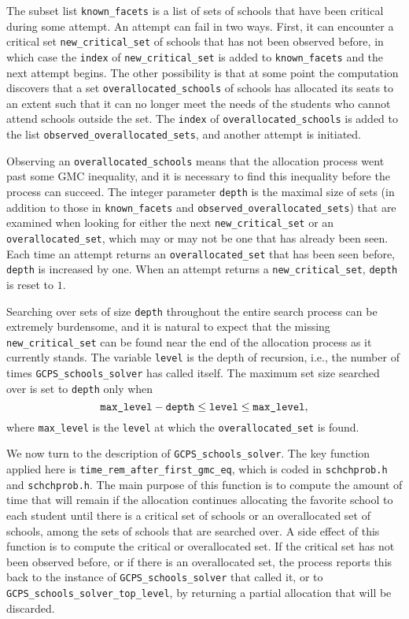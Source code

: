\documentclass[12pt]{article}
\theoremstyle{definition}
\begin{document}
\begin{appendix}
The subset list \texttt{known\_facets} is a list of sets of schools
that have been critical during some attempt.  An attempt can fail in two
ways.  First, it can encounter a critical set
\texttt{new\_critical\_set} of schools that has not been observed
before, in which case the \texttt{index} of
\texttt{new\_critical\_set} is added to \texttt{known\_facets} and the
next attempt begins.  The other possibility is that at some point the
computation discovers that a set \texttt{overallocated\_schools} of
schools has allocated its seats to an extent such that it can no
longer meet the needs of the students who cannot attend schools
outside the set.  The \texttt{index} of
\texttt{overallocated\_schools} is added to the list
\texttt{observed\_overallocated\_sets}, and another attempt is
initiated.

Observing an \texttt{overallocated\_schools} means that the allocation
process went past some GMC inequality, and it is necessary to find this
inequality before the process can succeed.  The integer parameter
\texttt{depth} is the maximal size of sets (in addition to those in
\texttt{known\_facets} and \texttt{observed\_overallocated\_sets})
that are examined when looking for either the next
\texttt{new\_critical\_set} or an \texttt{overallocated\_set}, which
may or may not be one that has already been seen.  Each time an
attempt returns an \texttt{overallocated\_set} that has been seen
before, \texttt{depth} is increased by one.  When an attempt returns a
\texttt{new\_critical\_set}, \texttt{depth} is reset to $1$.

Searching over sets of size \texttt{depth} throughout the entire
search process can be extremely burdensome, and it is natural to
expect that the missing \texttt{new\_critical\_set} can be found near
the end of the allocation process as it currently stands.  The
variable \texttt{level} is the depth of recursion, i.e., the number of
times \texttt{GCPS\_schools\_solver} has called itself. The maximum
set size searched over is set to \texttt{depth} only when
$$\text{\texttt{max\_level}} - \text{\texttt{depth}} \le
\text{\texttt{level}} \le \text{\texttt{max\_level}},$$ where
\texttt{max\_level} is the \texttt{level} at which the
\texttt{overallocated\_set} is found.

We now turn to the description of \texttt{GCPS\_schools\_solver}. The
key function applied here is
\texttt{time\_rem\_after\_first\_gmc\_eq}, which is
coded in \texttt{schchprob.h} and \texttt{schchprob.h}. The main
purpose of this function is to compute the amount of time that will
remain if the allocation continues allocating the favorite school to
each student until there is a critical set of schools or an
overallocated set of schools, among the sets of schools that are
searched over.  A side effect of this function is to compute the
critical or overallocated set.  If the critical set has not been
observed before, or if there is an overallocated set, the process
reports this back to the instance of \texttt{GCPS\_schools\_solver}
that called it, or to \texttt{GCPS\_schools\_solver\_top\_level}, by
returning a partial allocation that will be discarded.


\end{appendix}
\end{document}
